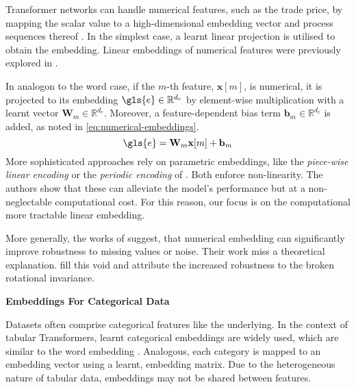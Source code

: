 Transformer networks can handle numerical features, such as the trade price, by mapping the scalar value to a high-dimensional embedding vector and process sequences thereof \autocite[][3]{gorishniyEmbeddingsNumericalFeatures2022}. In the simplest case, a learnt linear projection is utilised to obtain the embedding. Linear embeddings of numerical features were previously explored in \textcites[][3]{kossenSelfAttentionDatapointsGoing2021}[][4]{somepalliSaintImprovedNeural2021}[][4]{gorishniyRevisitingDeepLearning2021}.

In analogon to the word case, if the $m$-th feature, $\mathbf{x}[m]$, is numerical, it is projected to its embedding $\gls{e} \in \mathbb{R}^{d_e}$ by element-wise multiplication with a learnt vector $\mathbf{W}_m \in \mathbb{R}^{d_{e}}$. Moreover, a feature-dependent bias term $\mathbf{b}_m \in \mathbb{R}^{d_{e}}$ is added, as noted in \cref{eq:numerical-embeddings}.
\begin{equation}
    \gls{e}= \mathbf{W}_m \mathbf{x}[m] +\mathbf{b}_m
    \label{eq:numerical-embeddings}
\end{equation}
More sophisticated approaches rely on parametric embeddings, like the \emph{piece-wise linear encoding} or the \emph{periodic encoding} of \textcite[][10]{gorishniyEmbeddingsNumericalFeatures2022}. Both enforce non-linearity. The authors show that these can alleviate the model's performance but at a non-neglectable computational cost. For this reason, our focus is on the computational more tractable linear embedding.

More generally, the works of \textcites[][1]{gorishniyEmbeddingsNumericalFeatures2022}[][1]{somepalliSaintImprovedNeural2021} suggest, that numerical embedding can significantly improve robustness to missing values or noise. Their work miss a theoretical explanation. \textcite[][8--9]{grinsztajnWhyTreebasedModels2022} fill this void and attribute the increased robustness to the broken rotational invariance.

\textbf{Embeddings For Categorical Data}

Datasets often comprise categorical features like the underlying. In the context of tabular Transformers, learnt categorical embeddings are widely used, which are similar to the word embedding
\autocites[][4]{gorishniyRevisitingDeepLearning2021}[][2]{huangTabTransformerTabularData2020}[][4]{somepalliSaintImprovedNeural2021}. Analogous, each category is mapped to an embedding vector using a learnt, embedding matrix. Due to the heterogeneous nature of tabular data, embeddings may not be shared between features.

